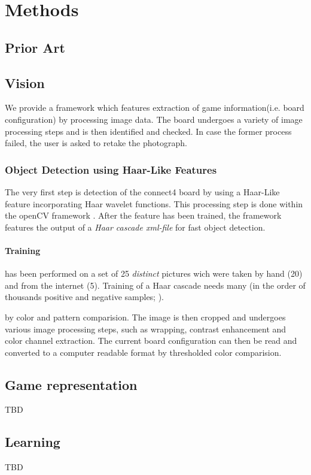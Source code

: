 \documentclass[10pt,twocolumn,letterpaper]{article}
\begin{document}
\section{Methods}

\subsection{Prior Art}

\subsection{Vision}
We provide a framework which features extraction of game information(i.e. board configuration) by processing image data.
The board undergoes a variety of image processing steps and is then identified and checked.
In case the former process failed, the user is asked to retake the photograph.

\subsubsection{Object Detection using Haar-Like Features}
The very first step is detection of the connect4 board by using a Haar-Like feature incorporating Haar wavelet functions.
This processing step is done within the openCV framework \parencite{openCV}.
After the feature has been trained, the framework features the output of a \textit{Haar cascade xml-file} for fast object detection.

\paragraph{Training} has been performed on a set of 25 \textit{distinct} pictures wich were taken by hand (20) and from the internet (5).
Training of a Haar cascade needs many (in the order of thousands positive and negative samples;  \cite{kuranov}).




 by color and pattern comparision.
The image is then cropped and undergoes various image processing steps, such as wrapping, contrast enhancement and color channel extraction.
The current board configuration can then be read and converted to a computer readable format by thresholded color comparision.

\subsection{Game representation}
TBD
\subsection{Learning}
TBD
\end{document}
